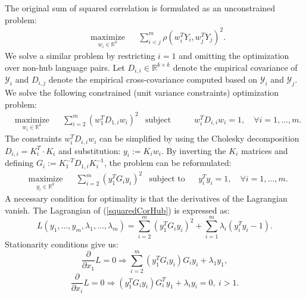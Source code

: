 \documentclass[twoside,11pt]{article}
\newcommand{\RR}{\mathbb{R}}
\begin{document}
The original sum of squared correlation is formulated as an unconstrained problem:
\begin{equation*}
  \begin{aligned}
    & \underset{w_i \in \RR^{k}}{\text{maximize}}
    & & \sum_{i < j}^m  \rho(w_i^T Y_i, w_j^T Y_j)^2.
\end{aligned}
\end{equation*}
We solve a similar problem by restricting $i=1$ and omitting the optimization over non-hub language pairs.
Let $D_{i,i} \in \RR^{k \times k}$ denote the empirical covariance of $\mathcal{Y}_i$ and $D_{i,j}$ denote the empirical cross-covariance computed based on $\mathcal{Y}_i$ and $\mathcal{Y}_j$. We solve the following constrained (unit variance constraints) optimization problem:
\begin{equation}\label{squaredCorHubOriginal}
  \begin{aligned}
    & \underset{w_i \in \RR^{k}}{\text{maximize}}
    & & \sum_{i = 2}^m  \left(w_1^T D_{1,i} w_i \right)^2
    & \text{subject to}
    & & w_i^T D_{i,i} w_i = 1, \quad\forall i = 1,\ldots, m.
\end{aligned}
\end{equation}
The constraints $w_i^T D_{i,i} w_i$ can be simplified by using the Cholesky decomposition $D_{i,i} = K_i^T \cdot K_i$ and substitution: $y_i := K_i w_i$. By inverting the $K_i$ matrices and defining  $G_i := K_1^{-T} D_{1,i} K_i^{-1}$, the problem can be reformulated:
\begin{equation}\label{squaredCorHub}
  \begin{aligned}
    & \underset{y_i \in \RR^{k}}{\text{maximize}}
    & & \sum_{i = 2}^m  \left(y_1^T G_{i} y_i \right)^2
    & \text{subject to}
    & & y_i^T y_i = 1, \quad\forall i = 1,\ldots, m.
\end{aligned}
\end{equation}
A necessary condition for optimality is that the derivatives of the Lagrangian vanish. The Lagrangian of (\ref{squaredCorHub}) is expressed as:
$$  L(y_1, \ldots, y_m, \lambda_1, \ldots, \lambda_m) = \sum_{i = 2}^m  \left(y_1^T G_{i} y_i \right)^2 + \sum_{i=1}^m \lambda_i \left(y_i^T y_i - 1\right).$$
Stationarity conditions give us:
\begin{equation}\label{dLdx1}
 \frac{\partial}{\partial x_1} L = 0 \Rightarrow \sum_{i = 2}^m  \left(y_1^T G_{i} y_i \right) G_i y_i + \lambda_1 y_1,
\end{equation}
\begin{equation}\label{dLdxi}
\frac{\partial}{\partial x_i} L = 0 \Rightarrow \left(y_1^T G_{i} y_i \right) G_{i}^T y_1 + \lambda_i y_i = 0,~i > 1.
\end{equation}
\end{document}
